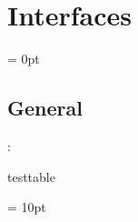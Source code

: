 
\section{Interfaces} 


\parskip = 0pt

\vspace{3mm} \subsection*{General}

: 

testtable
\vspace{2mm}

\vspace{5mm}\parskip = 10pt 
